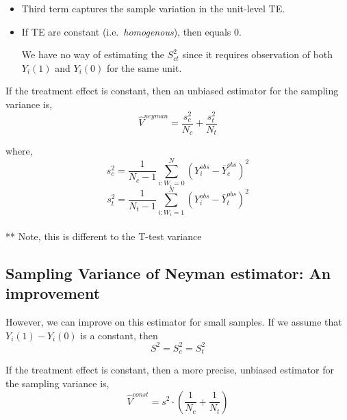 \documentclass[
  letterpaper,
  DIV=11,
  numbers=noendperiod]{scrreprt}
\theoremstyle{definition}
\theoremstyle{remark}
\begin{document}
\begin{itemize}
\item
  Third term captures the sample variation in the unit-level TE.
\item
  If TE are constant (i.e.~\emph{homogenous}), then equals 0.

  We have no way of estimating the \(S^2_{ct}\) since it requires
  observation of both \(Y_i(1)\) and \(Y_i(0)\) for the same unit.
\end{itemize}

\begin{tcolorbox}[enhanced jigsaw, bottomrule=.15mm, coltitle=black, arc=.35mm, left=2mm, opacityback=0, leftrule=.75mm, colbacktitle=quarto-callout-important-color!10!white, title={Theorem: Neyman's variance estimator}, toprule=.15mm, bottomtitle=1mm, breakable, colframe=quarto-callout-important-color-frame, opacitybacktitle=0.6, titlerule=0mm, colback=white, rightrule=.15mm, toptitle=1mm]

If the treatment effect is constant, then an unbiased estimator for the
sampling variance is, \[
        \hat{V}^{neyman} = \frac{s^2_c}{N_c}+\frac{s^2_t}{N_t}
\]

\end{tcolorbox}

where, \[
        s^2_c = \frac{1}{N_c-1}\sum_{i:W_i=0}^N (Y_i^{obs}-\bar{Y}^{obs}_c)^2
\] \[
        s^2_t = \frac{1}{N_t-1}\sum_{i:W_i=1}^N (Y_i^{obs}-\bar{Y}^{obs}_t)^2
\]\\
** Note, this is different to the T-test variance

\subsection{Sampling Variance of Neyman estimator: An
improvement}\label{sampling-variance-of-neyman-estimator-an-improvement}

However, we can improve on this estimator for small samples. If we
assume that \(Y_i(1)-Y_i(0)\) is a constant, then \[
S^2 = S^2_c=S^2_t
\]

\begin{tcolorbox}[enhanced jigsaw, bottomrule=.15mm, coltitle=black, arc=.35mm, left=2mm, opacityback=0, leftrule=.75mm, colbacktitle=quarto-callout-important-color!10!white, title={Constant variance estimator}, toprule=.15mm, bottomtitle=1mm, breakable, colframe=quarto-callout-important-color-frame, opacitybacktitle=0.6, titlerule=0mm, colback=white, rightrule=.15mm, toptitle=1mm]

If the treatment effect is constant, then a more precise, unbiased
estimator for the sampling variance is, \[
            \hat{V}^{const} = s^2\cdot\left(\frac{1}{N_c}+\frac{1}{N_t}\right)
\]

\end{tcolorbox}
\end{document}
